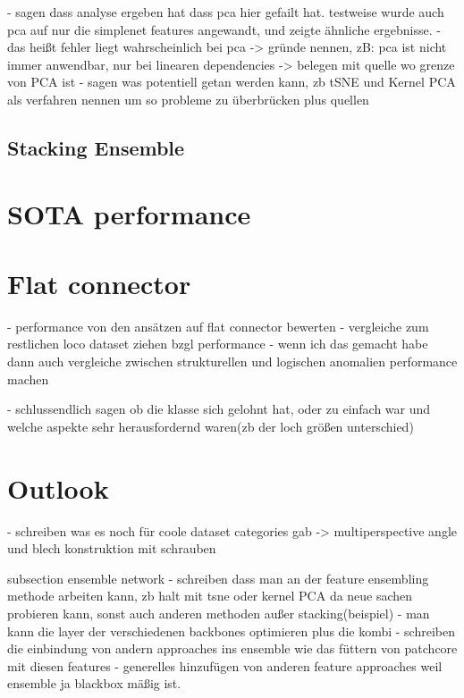 - sagen dass analyse ergeben hat dass pca hier gefailt hat. testweise wurde auch pca auf nur die simplenet features angewandt, und zeigte ähnliche ergebnisse.
- das heißt fehler liegt wahrscheinlich bei pca
-> gründe nennen, zB: pca ist nicht immer anwendbar, nur bei linearen dependencies
-> belegen mit quelle wo grenze von PCA ist
- sagen was potentiell getan werden kann, zb tSNE und Kernel PCA als verfahren nennen um so probleme zu überbrücken plus quellen


\subsection{Stacking Ensemble}
\label{subsec:stackingconc}

\section{SOTA performance}
\label{sec:sotaperformanceconc}

\section{Flat connector}
\label{sec:flatconnectorconc}

- performance von den ansätzen auf flat connector bewerten
- vergleiche zum restlichen loco dataset ziehen bzgl performance
- wenn ich das gemacht habe dann auch vergleiche zwischen strukturellen und logischen anomalien performance machen

- schlussendlich sagen ob die klasse sich gelohnt hat, oder zu einfach war und welche aspekte sehr herausfordernd waren(zb der loch größen unterschied)

\section{Outlook}
\label{sec:outlook}


- schreiben was es noch für coole dataset categories gab -> multiperspective angle und blech konstruktion mit schrauben

subsection ensemble network
- schreiben dass man an der feature ensembling methode arbeiten kann, zb halt mit tsne oder kernel PCA da neue sachen probieren kann, sonst auch anderen methoden außer stacking(beispiel)
- man kann die layer der verschiedenen backbones optimieren plus die kombi
- schreiben die einbindung von andern approaches ins ensemble wie das füttern von patchcore mit diesen features
- generelles hinzufügen von anderen feature approaches weil ensemble ja blackbox mäßig ist.
